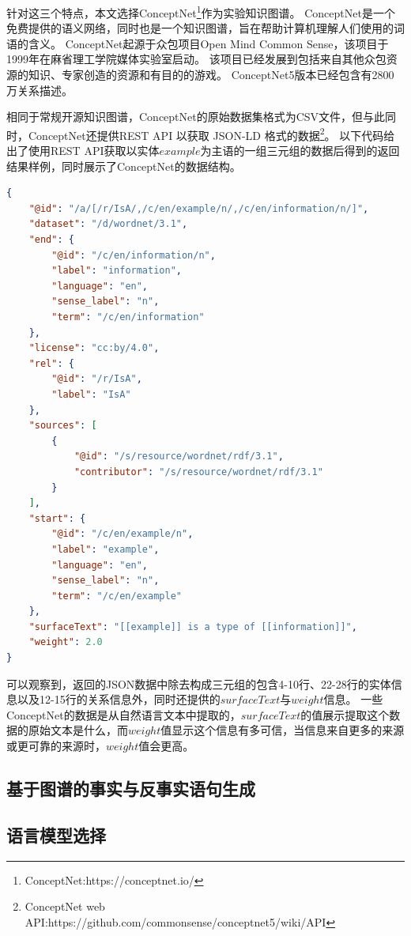 针对这三个特点，本文选择ConceptNet\footnote{ConceptNet:https://conceptnet.io/}作为实验知识图谱。
ConceptNet是一个免费提供的语义网络，同时也是一个知识图谱，旨在帮助计算机理解人们使用的词语的含义。
ConceptNet起源于众包项目Open Mind Common Sense，该项目于1999年在麻省理工学院媒体实验室启动。
该项目已经发展到包括来自其他众包资源的知识、专家创造的资源和有目的的游戏。
ConceptNet5版本已经包含有2800万关系描述。

相同于常规开源知识图谱，ConceptNet的原始数据集格式为CSV文件，但与此同时，ConceptNet还提供REST API 以获取 JSON-LD 格式的数据\footnote{ConceptNet web API:https://github.com/commonsense/conceptnet5/wiki/API}。
以下代码给出了使用REST API获取以实体$example$为主语的一组三元组的数据后得到的返回结果样例，同时展示了ConceptNet的数据结构。


\begin{lstlisting}[language=json,firstnumber=1]
{
    "@id": "/a/[/r/IsA/,/c/en/example/n/,/c/en/information/n/]",
    "dataset": "/d/wordnet/3.1",
    "end": {
        "@id": "/c/en/information/n",
        "label": "information",
        "language": "en",
        "sense_label": "n",
        "term": "/c/en/information"
    },
    "license": "cc:by/4.0",
    "rel": {
        "@id": "/r/IsA",
        "label": "IsA"
    },
    "sources": [
        {
            "@id": "/s/resource/wordnet/rdf/3.1",
            "contributor": "/s/resource/wordnet/rdf/3.1"
        }
    ],
    "start": {
        "@id": "/c/en/example/n",
        "label": "example",
        "language": "en",
        "sense_label": "n",
        "term": "/c/en/example"
    },
    "surfaceText": "[[example]] is a type of [[information]]",
    "weight": 2.0
}
\end{lstlisting}

可以观察到，返回的JSON数据中除去构成三元组的包含4-10行、22-28行的实体信息以及12-15行的关系信息外，同时还提供的$surfaceText$与$weight$信息。
一些ConceptNet的数据是从自然语言文本中提取的，$surfaceText$的值展示提取这个数据的原始文本是什么，而$weight$值显示这个信息有多可信，当信息来自更多的来源或更可靠的来源时，$weight$值会更高。


\subsection{基于图谱的事实与反事实语句生成}


\subsection{语言模型选择}

